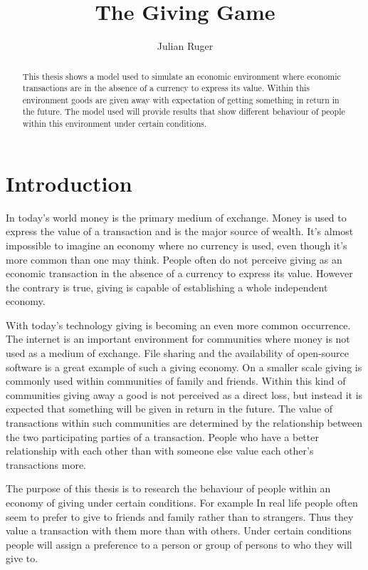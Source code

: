 \documentclass[twoside,openright]{uva-bachelor-thesis}
\title{The Giving Game}
\author{Julian Ruger}
\begin{document}
\maketitle
\begin{abstract}
This thesis shows a model used to simulate an economic environment where economic transactions are in the absence of a currency to express its value. Within this environment goods are given away with expectation of getting something in return in the future. The model used will provide results that show different behaviour of people within this environment under certain conditions.
\end{abstract}

\tableofcontents

\chapter{Introduction}
In today's world money is the primary medium of exchange. Money is used to express the value of a transaction and is the major source of wealth. It's almost impossible to imagine an economy where no currency is used, even though it's more common than one may think. People often do not perceive giving as an economic transaction in the absence of a currency to express its value. However the contrary is true, giving is capable of establishing a whole independent economy. 

With today's technology giving is becoming an even more common occurrence. The internet is an important environment for communities where money is not used as a medium of exchange. File sharing and the availability of open-source software is a great example of such a giving economy. On a smaller scale giving is commonly used within communities of family and friends. Within this kind of communities giving away a good is not perceived as a direct loss, but instead it is expected that something will be given in return in the future. The value of transactions within such communities are determined by the relationship between the two participating parties of a transaction. People who have a better relationship with each other than with someone else value each other’s transactions more. 

The purpose of this thesis is to research the behaviour of people within an economy of giving under certain conditions. For example In real life people often seem to prefer to give to friends and family rather than to strangers. Thus they value a transaction with them more than with others. Under certain conditions people will assign a preference to a person or group of persons to who they will give to. 
\end{document}
